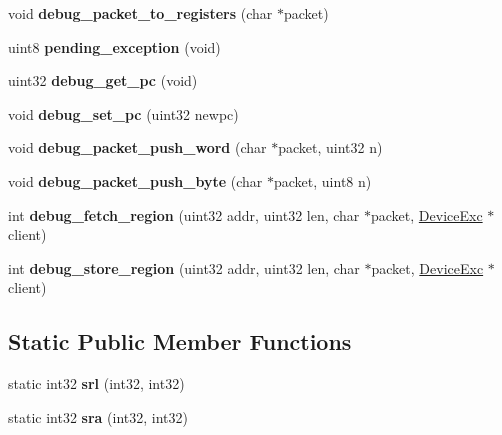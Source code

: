 \begin{DoxyCompactItemize}
\item 
\hypertarget{classCPU_a0fcea0002fb73af0ccdc07c8637b4020}{
void {\bfseries debug\_\-packet\_\-to\_\-registers} (char $\ast$packet)}
\label{classCPU_a0fcea0002fb73af0ccdc07c8637b4020}

\item 
\hypertarget{classCPU_a5be6cb440e54fb4f675fd9d6c1c1cb09}{
uint8 {\bfseries pending\_\-exception} (void)}
\label{classCPU_a5be6cb440e54fb4f675fd9d6c1c1cb09}

\item 
\hypertarget{classCPU_a9c56f582e6047ddd8bd2326c5af8d6f4}{
uint32 {\bfseries debug\_\-get\_\-pc} (void)}
\label{classCPU_a9c56f582e6047ddd8bd2326c5af8d6f4}

\item 
\hypertarget{classCPU_ae91c482028158094c67a9e3c626453e5}{
void {\bfseries debug\_\-set\_\-pc} (uint32 newpc)}
\label{classCPU_ae91c482028158094c67a9e3c626453e5}

\item 
\hypertarget{classCPU_a80b7efe3902cde8b1bab4849aa56d092}{
void {\bfseries debug\_\-packet\_\-push\_\-word} (char $\ast$packet, uint32 n)}
\label{classCPU_a80b7efe3902cde8b1bab4849aa56d092}

\item 
\hypertarget{classCPU_a8d2f406bc498ebe8a5f06c8461668c09}{
void {\bfseries debug\_\-packet\_\-push\_\-byte} (char $\ast$packet, uint8 n)}
\label{classCPU_a8d2f406bc498ebe8a5f06c8461668c09}

\item 
\hypertarget{classCPU_a7a38e0be35e2562521592c90170878fc}{
int {\bfseries debug\_\-fetch\_\-region} (uint32 addr, uint32 len, char $\ast$packet, \hyperlink{classDeviceExc}{DeviceExc} $\ast$client)}
\label{classCPU_a7a38e0be35e2562521592c90170878fc}

\item 
\hypertarget{classCPU_a19ccd19ddb57bcb4dfb13083a989bfe3}{
int {\bfseries debug\_\-store\_\-region} (uint32 addr, uint32 len, char $\ast$packet, \hyperlink{classDeviceExc}{DeviceExc} $\ast$client)}
\label{classCPU_a19ccd19ddb57bcb4dfb13083a989bfe3}

\end{DoxyCompactItemize}
\subsection*{Static Public Member Functions}
\begin{DoxyCompactItemize}
\item 
\hypertarget{classCPU_a801bca1865875594f3d36de6c0764cbb}{
static int32 {\bfseries srl} (int32, int32)}
\label{classCPU_a801bca1865875594f3d36de6c0764cbb}

\item 
\hypertarget{classCPU_a8e214a3b7f472087372e8dc826364304}{
static int32 {\bfseries sra} (int32, int32)}
\label{classCPU_a8e214a3b7f472087372e8dc826364304}

\end{DoxyCompactItemize}
